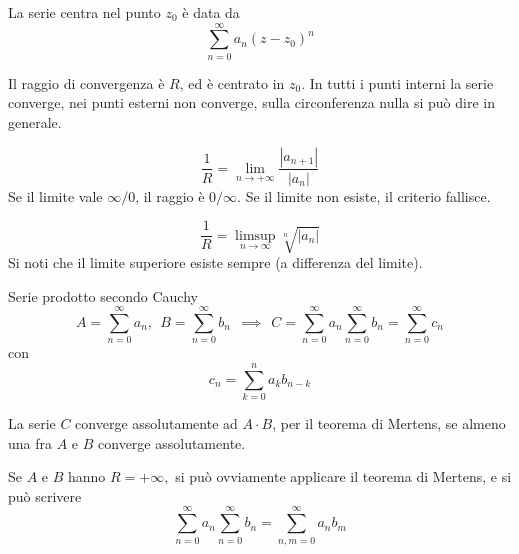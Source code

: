 \Soluzione

\begin{defn}
La serie centra nel punto $z_{0}$ è data da
\begin{equation*}
\sum\limits^{\infty}_{n = 0} a_{n}\left(z - z_{0}\right)^{n}
\end{equation*}
\end{defn}
\begin{rem}
Il raggio di convergenza è $R$, ed è centrato in $z_{0}$. In tutti i punti interni la serie converge, nei punti esterni non converge, sulla circonferenza nulla si può dire in generale.
\end{rem}
\begin{thm}
\begin{equation*}
\frac{1}{R} = \lim\limits_{n\rightarrow + \infty}\frac{\left| a_{n + 1}\right|}{\left| a_{n}\right|}
\end{equation*}
Se il limite vale $\infty /0$, il raggio è $0/\infty $. Se il limite non esiste, il criterio fallisce.
\end{thm}
\begin{thm}
\begin{equation*}
\frac{1}{R} = \limsup\limits_{n\rightarrow \infty}\sqrt[n]{\left| a_{n}\right|}
\end{equation*}
Si noti che il limite superiore esiste sempre (a differenza del limite).
\end{thm}
\begin{defn}
Serie prodotto secondo Cauchy
\begin{equation*}
A = \sum\limits^{\infty}_{n = 0} a_{n}, \ \ B = \sum\limits^{\infty}_{n = 0} b_{n} \ \ \implies \ \ C = \sum\limits^{\infty}_{n = 0} a_{n}\sum\limits^{\infty}_{n = 0} b_{n} = \sum\limits^{\infty}_{n = 0} c_{n}
\end{equation*}
con
\begin{equation*}
c_{n} = \sum\limits^{n}_{k = 0} a_{k} b_{n - k}
\end{equation*}
\end{defn}
\begin{thm}
La serie $C$ converge assolutamente ad $A \cdot B$, per il teorema di Mertens, se almeno una fra $A$ e $B$ converge assolutamente.

Se $A$ e $B$ hanno $R = +\infty, $ si può ovviamente applicare il teorema di Mertens, e si può scrivere
\begin{equation*}
\sum\limits^{\infty}_{n = 0} a_{n}\sum\limits^{\infty}_{n = 0} b_{n} = \sum\limits^{\infty}_{n, m = 0} a_{n} b_{m}
\end{equation*}
\end{thm}

